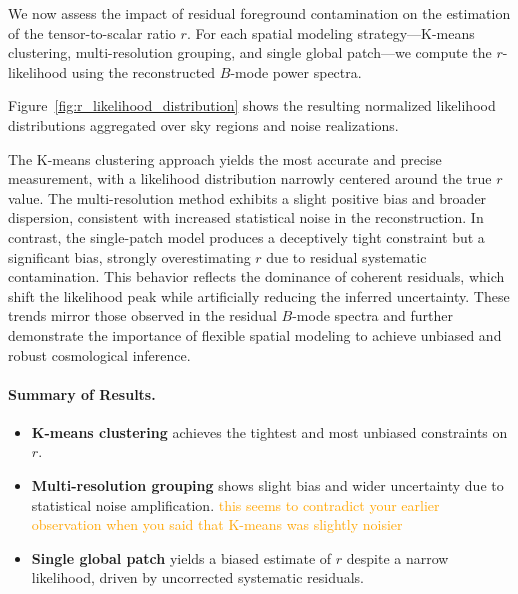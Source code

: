 \documentclass[fleqn,usenatbib]{mnras}
\newcommand{\je}[1]{\textcolor{orange}{#1}}
\begin{document}
We now assess the impact of residual foreground contamination on the estimation of the tensor-to-scalar ratio \( r \).
For each spatial modeling strategy—K-means clustering, multi-resolution grouping, and single global patch—we compute the \( r \)-likelihood using the reconstructed \( B \)-mode power spectra.

Figure~\ref{fig:r_likelihood_distribution} shows the resulting normalized likelihood distributions aggregated over sky regions and noise realizations.

The K-means clustering approach yields the most accurate and precise measurement, with a likelihood distribution narrowly centered around the true \( r \) value. 
The multi-resolution method exhibits a slight positive bias and broader dispersion, consistent with increased statistical noise in the reconstruction. 
In contrast, the single-patch model produces a deceptively tight constraint but a significant bias, strongly overestimating \( r \) due to residual systematic contamination.
This behavior reflects the dominance of coherent residuals, which shift the likelihood peak while artificially reducing the inferred uncertainty.
These trends mirror those observed in the residual \( B \)-mode spectra and further demonstrate the importance of flexible spatial modeling to achieve unbiased and robust cosmological inference.

\paragraph{Summary of Results.}
\begin{itemize}
    \item \textbf{K-means clustering} achieves the tightest and most unbiased constraints on \( r \).
    \item \textbf{Multi-resolution grouping} shows slight bias and wider uncertainty due to statistical noise amplification. \je{this seems to contradict your earlier observation when you said that K-means was slightly noisier}
    \item \textbf{Single global patch} yields a biased estimate of \( r \) despite a narrow likelihood, driven by uncorrected systematic residuals.
\end{itemize}
\end{document}
